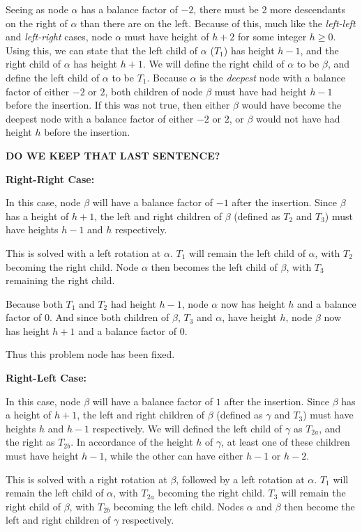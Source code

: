 \documentclass[a4paper, 12pt, titlepage]{article}
\begin{document}
Seeing as node $\alpha$ has a balance factor of $-2$,
there must be 2 more descendants on the right of $\alpha$ than there are on the left.
Because of this,
much like the \textit{left-left} and \textit{left-right} cases,
node $\alpha$ must have height of $h+2$ for some integer $h\geq{}0$.
Using this,
we can state that the left child of $\alpha$
($T_1$)
has height $h-1$,
and the right child of $\alpha$ has height $h+1$.
We will define the right child of $\alpha$ to be $\beta$,
and define the left child of $\alpha$ to be $T_1$.
Because $\alpha$ is the \textit{deepest} node with a balance factor of either $-2$ or $2$,
both children of node $\beta$ must have had height $h-1$ before the insertion.
If this was not true,
then either $\beta$ would have become the deepest node with a balance factor of either $-2$ or $2$,
or $\beta$ would not have had height $h$ before the insertion.

\textbf{DO WE KEEP THAT LAST SENTENCE?}

\noindent
\textbf{Right-Right Case:}

In this case,
node $\beta$ will have a balance factor of $-1$ after the insertion.
Since $\beta$ has a height of $h+1$,
the left and right children of $\beta$
(defined as $T_2$ and $T_3$)
must have heights $h-1$ and $h$ respectively.

This is solved with a left rotation at $\alpha$.
$T_1$ will remain the left child of $\alpha$,
with $T_2$ becoming the right child.
Node $\alpha$ then becomes the left child of $\beta$,
with $T_3$ remaining the right child.

Because both $T_1$ and $T_2$ had height $h-1$,
node $\alpha$ now has height $h$ and a balance factor of $0$.
And since both children of $\beta$,
$T_3$ and $\alpha$,
have height $h$,
node $\beta$ now has height $h+1$ and a balance factor of $0$.

Thus this problem node has been fixed.

\noindent
\textbf{Right-Left Case:}

In this case,
node $\beta$ will have a balance factor of $1$ after the insertion.
Since $\beta$ has a height of $h+1$,
the left and right children of $\beta$
(defined as $\gamma$ and $T_3$)
must have heights $h$ and $h-1$ respectively.
We will defined the left child of $\gamma$ as $T_{2a}$,
and the right as $T_{2b}$.
In accordance of the height $h$ of $\gamma$,
at least one of these children must have height $h-1$,
while the other can have either $h-1$ or $h-2$.

This is solved with a right rotation at $\beta$,
followed by a left rotation at $\alpha$.
$T_1$ will remain the left child of $\alpha$,
with $T_{2a}$ becoming the right child.
$T_3$ will remain the right child of $\beta$,
with $T_{2b}$ becoming the left child.
Nodes $\alpha$ and $\beta$ then become the left and right children of $\gamma$ respectively.
\end{document}
